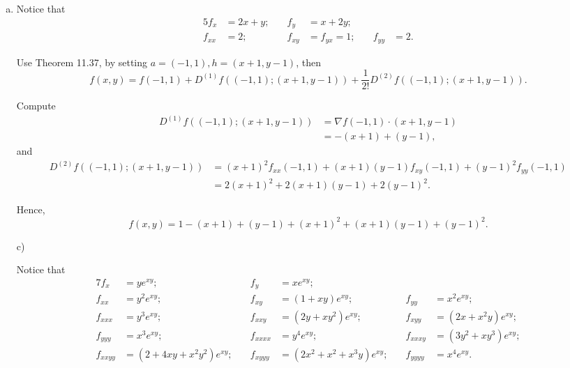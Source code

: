 \begin{Exercise}
\begin{enumerate}[a)]
\item
\begin{solution}
Notice that
\begin{alignat*}{5}
f_x &= 2x+y;&\quad f_y &= x+2y; &\quad &\quad\\
f_{x x} &= 2;&\quad f_{x y} &= f_{y x} = 1;&\quad f_{y y} &= 2.
\end{alignat*}

Use Theorem 11.37, by setting $a=(-1,1), h=(x+1,y-1)$, then
$$
f(x,y) = f(-1,1) + D^{(1)} f\left( (-1,1);(x+1,y-1)\right) + \frac{1}{2!} D^{(2)} f\left( (-1,1);(x+1,y-1) \right).
$$

Compute
\begin{align*}
D^{(1)} f\left( (-1,1);(x+1,y-1)\right)
&= \nabla f(-1,1)\cdot(x+1,y-1) \\
&= -(x+1)+(y-1),
\end{align*}
and
\begin{align*}
D^{(2)} f\left( (-1,1);(x+1,y-1) \right)
&= (x+1)^2 f_{x x}(-1, 1) + (x+1)(y-1) f_{x y}(-1,1) + (y-1)^2 f_{y y}(-1,1) \\
&= 2(x+1)^2 + 2(x+1)(y-1) + 2(y-1)^2.
\end{align*}

Hence,
$$
f(x,y) = 1-(x+1)+(y-1)+(x+1)^2+(x+1)(y-1)+(y-1)^2.
$$
\end{solution}

\item [c)]
\begin{solution}
Notice that
\begin{alignat*}{7}
f_x &= y e^{x y}; &\quad f_y &= x e^{x y};\\
f_{x x} &= y^2 e^{x y}; &\quad f_{x y} &= (1+x y)e^{x y}; &\quad f_{y y} &= x^2 e^{x y}; \\
f_{x x x} &= y^3 e^{x y}; &\quad f_{x x y} &= (2y+x y^2)e^{x y}; &\quad f_{x y y} &= (2x+x^2 y)e^{x y}; \\
f_{y y y} &= x^3 e^{x y}; &\quad f_{x x x x} &= y^4 e^{x y}; &\quad f_{x x x y} &= (3y^2+x y^3)e^{x y}; \\
f_{x x y y} &= (2+4x y+x^2 y^2)e^{x y}; &\quad f_{x y y y} &= (2x^2+x^2+x^3 y)e^{x y}; &\quad f_{y y y y} &= x^4 e^{x y}.
\end{alignat*}


\end{solution}
\end{enumerate}
\end{Exercise}
